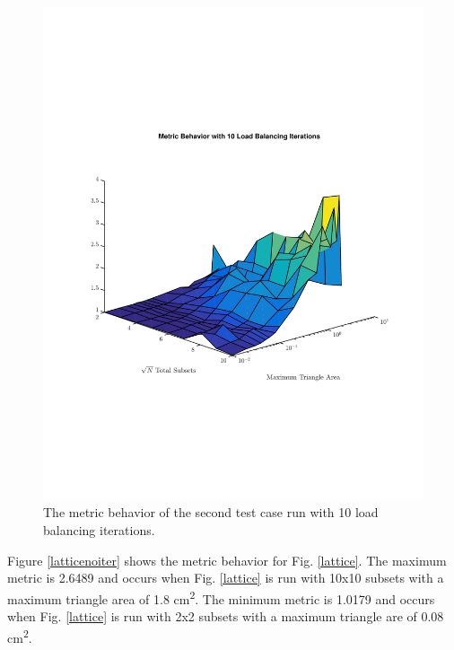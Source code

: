 \documentclass{anstrans}
\begin{document}
\begin{figure}[H]
\centering
\includegraphics[scale=0.50, trim = 2cm 6cm 2cm 7cm,clip]{figures/SameIter.pdf}
\caption{The metric behavior of the second test case run with 10 load balancing iterations.}
\label{sameiter}
\end{figure}

Figure \ref{latticenoiter} shows the metric behavior for Fig. \ref{lattice}. The maximum metric is 2.6489 and occurs when Fig. \ref{lattice} is run with 10x10 subsets with a maximum triangle area of 1.8 cm\textsuperscript{2}. The minimum metric is 1.0179 and occurs when Fig. \ref{lattice} is run with 2x2 subsets with a maximum triangle are of 0.08 cm\textsuperscript{2}.
\end{document}
